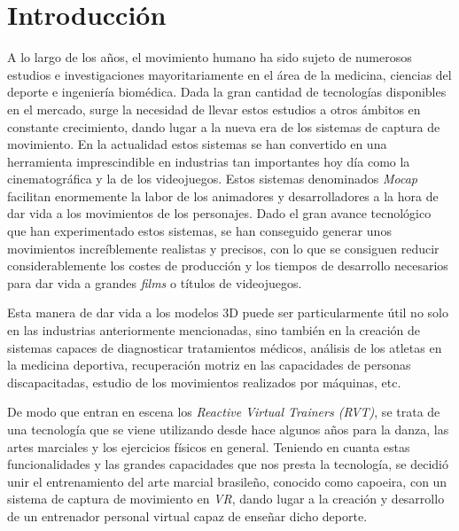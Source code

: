 %
%



\chapter{Introducción}
\label{cap1:sec:introduccion}

A lo largo de los años, el movimiento humano ha sido sujeto de numerosos estudios e investigaciones mayoritariamente en el área de la medicina, ciencias del deporte e ingeniería biomédica. Dada la gran cantidad de tecnologías disponibles en el mercado, surge la necesidad de llevar estos estudios a otros ámbitos en constante crecimiento, dando lugar a la nueva era de los sistemas de captura de movimiento. En la actualidad estos sistemas se han convertido en una herramienta imprescindible en industrias tan importantes hoy día como la cinematográfica y la de los videojuegos. Estos sistemas denominados \textit{Mocap} facilitan enormemente la labor de los animadores y desarrolladores a la hora de dar vida a los movimientos de los personajes. Dado el gran avance tecnológico que han experimentado estos sistemas, se han conseguido generar unos movimientos increíblemente realistas y precisos, con lo que se consiguen reducir considerablemente los costes de producción y los tiempos de desarrollo necesarios para dar vida a grandes \textit{films} o títulos de videojuegos. 

Esta manera de dar vida a los modelos 3D puede ser particularmente útil no solo en las industrias anteriormente mencionadas, sino también en la creación de sistemas capaces de diagnosticar tratamientos médicos, análisis de los atletas en la medicina deportiva, recuperación motriz en las capacidades de personas discapacitadas, estudio de los movimientos realizados por máquinas, etc.

De modo que entran en escena los \textit{Reactive Virtual Trainers (RVT)}, se trata de una tecnología que se viene utilizando desde hace algunos años para la danza, las artes marciales y los ejercicios físicos en general. Teniendo en cuanta estas funcionalidades y las grandes capacidades que nos presta la tecnología, se decidió unir el entrenamiento del arte marcial brasileño, conocido como capoeira, con un sistema de captura de movimiento en \textit{VR}, dando lugar a la creación y desarrollo de un entrenador personal virtual capaz de enseñar dicho deporte. 


